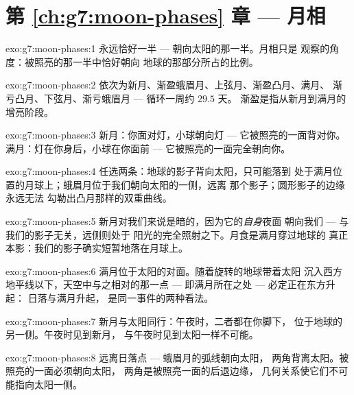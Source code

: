 \section*{第 \ref{ch:g7:moon-phases} 章 --- 月相}

\begin{solution}{exo:g7:moon-phases:1}
永远恰好一半 --- 朝向太阳的那一半。月相只是
观察的角度：被照亮的那一半中恰好朝向
地球的那部分所占的比例。
\end{solution}

\begin{solution}{exo:g7:moon-phases:2}
依次为新月、渐盈蛾眉月、上弦月、渐盈凸月、满月、
渐亏凸月、下弦月、渐亏蛾眉月 --- 循环一周约 $29.5$ 天。
渐盈是指从新月到满月的增亮阶段。
\end{solution}

\begin{solution}{exo:g7:moon-phases:3}
新月：你面对灯，小球朝向灯 ---
它被照亮的一面背对你。满月：灯在你身后，小球在你面前 ---
它被照亮的一面完全朝向你。
\end{solution}

\begin{solution}{exo:g7:moon-phases:4}
任选两条：地球的影子背向太阳，只可能落到
处于满月位置的月球上；蛾眉月位于我们朝向太阳的一侧，远离
那个影子；圆形影子的边缘永远无法
勾勒出凸月那样的双重曲线。
\end{solution}

\begin{solution}{exo:g7:moon-phases:5}
新月对我们来说是暗的，因为它的\emph{自身}夜面
朝向我们 --- 与我们的影子无关，远侧则处于
阳光的完全照射之下。月食是满月穿过地球的
真正本影：我们的影子确实短暂地落在月球上。
\end{solution}

\begin{solution}{exo:g7:moon-phases:6}
满月位于太阳的对面。随着旋转的地球带着太阳
沉入西方地平线以下，天空中与之相对的那一点 ---
即满月所在之处 --- 必定正在东方升起：
日落与满月升起，
是同一事件的两种看法。
\end{solution}

\begin{solution}{exo:g7:moon-phases:7}
新月与太阳同行：午夜时，二者都在你脚下，
位于地球的另一侧。午夜时见到新月，
与午夜时见到太阳一样不可能。
\end{solution}

\begin{solution}{exo:g7:moon-phases:8}
远离日落点 --- 蛾眉月的弧线朝向太阳，
两角背离太阳。被照亮的一面必须朝向太阳，
两角是被照亮一面的后退边缘，
几何关系使它们不可能指向太阳一侧。
\end{solution}


